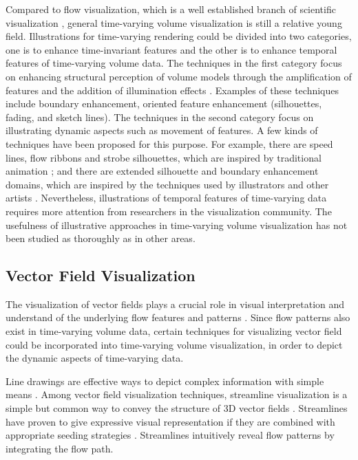 Compared to flow visualization, which is a well established branch of scientific visualization \cite{brambilla_illustrative_2012}, general time-varying volume visualization is still a relative young field.
Illustrations for time-varying rendering could be divided into two categories, one is to enhance time-invariant features and the other is to enhance temporal features of time-varying volume data. The techniques in the first category focus on enhancing structural perception of volume models through the amplification of features and the addition of illumination effects \cite{rheingans_volume_2001} \cite{joshi_illustration-inspired_2005}. Examples of these techniques include boundary enhancement, oriented feature enhancement (silhouettes, fading, and sketch lines). The techniques in the second category focus on illustrating dynamic aspects such as movement of features. A few kinds of techniques have been proposed for this purpose. For example, there are speed lines, flow ribbons and strobe silhouettes, which are inspired by traditional animation \cite{joshi_illustration-inspired_2005} \cite{joshi_evaluation_2008} \cite{joshi_case_2009}; and there are extended silhouette and boundary enhancement domains, which are inspired by the techniques used by illustrators and other artists \cite{svakhine_illustration_2005}. Nevertheless, illustrations of temporal features of time-varying data requires more attention from researchers in the visualization community. The usefulness of illustrative approaches in time-varying volume visualization has not been studied as thoroughly as in other areas.

\subsection{Vector Field Visualization}
The visualization of vector fields plays a crucial role in visual interpretation and understand of the underlying flow features and patterns \cite{kuhn_clustering-based_2011} \cite{ma_coherent_2013}. Since flow patterns also exist in time-varying volume data, certain techniques for visualizing vector field could be incorporated into time-varying volume visualization, in order to depict the dynamic aspects of time-varying data.

Line drawings are effective ways to depict complex information with simple means \cite{benard_state---art_2011}.
Among vector field visualization techniques, streamline visualization is a simple but common way to convey the structure of 3D vector fields \cite{chen_illustrative_2011}. Streamlines have proven to give expressive visual representation if they are combined with appropriate seeding strategies \cite{annen_vector_2008}. Streamlines intuitively reveal flow patterns by integrating the flow path.


